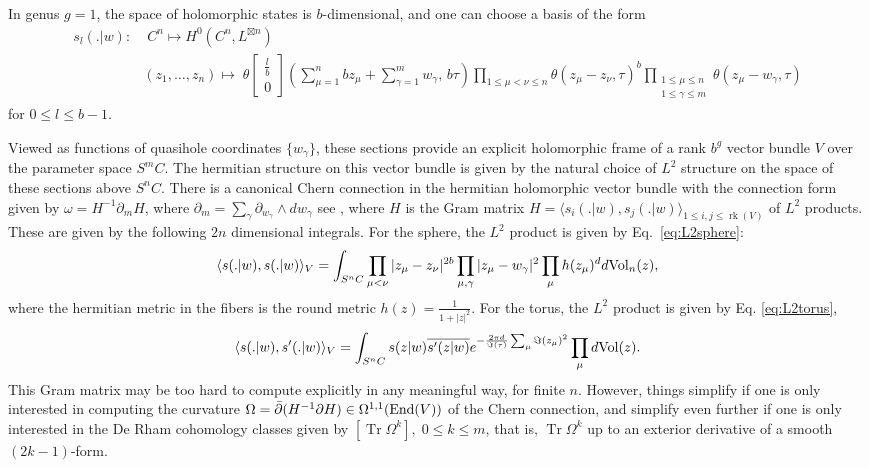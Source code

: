 \documentclass{article}
\theoremstyle{definition}
\DeclareMathOperator{\rk}{rk}
\DeclareMathOperator{\tr}{Tr}
\newcommand{\chara}[2]{\begin{bmatrix} #1 \\ #2 \end{bmatrix}}
\newcommand{\ov}[1]{\overline{#1}}
\renewcommand{\leq}{\leqslant}
\begin{document}
In genus \(g=1\), the space of holomorphic states is \(b\)-dimensional, and one can choose a basis of the form
\begin{align*}
s_l(.|w):&\; C^n\mapsto H^0(C^n, L^{\boxtimes n})\\ & (z_1,\dots,z_n) \mapsto \; \theta \chara{\frac{l}{b}}{0} \left(\sum_{\mu=1}^n b z_\mu + \sum_{\gamma=1}^m w_\gamma,\,b\tau\right)
\prod_{1\leqslant\mu<\nu\leqslant n} \theta(z_\mu - z_\nu,\tau)^b
\prod_{\substack{1\leqslant\mu\leqslant n\\1\leqslant\gamma\leqslant m}}\theta(z_\mu-w_\gamma,\tau)
\end{align*}
for $0 \leq l \leq b-1$.

Viewed as functions of quasihole coordinates $\{w_\gamma\}$, these sections provide an explicit holomorphic frame of a rank $b^g$ vector bundle $V$ over the parameter space $S^mC$. The hermitian structure on this vector bundle is given by the natural choice of $L^2$ structure on the space of these sections above $S^nC$. There is a canonical Chern connection in the hermitian holomorphic vector bundle with the connection form given by $\omega=H^{-1}\partial_m H$, where $\partial_m=\sum_\gamma\partial_{w_\gamma}\wedge dw_\gamma$ see \cite[Ch.1]{Kobayashi}, where $H$ is
the Gram matrix $H=\langle s_i(.|w) ,s_j(.|w)\rangle_{1\leq i , j \leq \rk(V)}$ of $L^2$ products. These are given by the following $2n$ dimensional integrals. For the sphere, the $L^2$ product is given by Eq.\ \eqref{eq:L2sphere}:
\begin{equation*}
\langle s(.|w),s(.|w) \rangle_V=\int_{S^n C}\prod_{\mu<\nu} |z_\mu - z_\nu |^{2b} \prod_{\mu,\gamma}  |z_\mu-w_\gamma|^2 \prod_\mu h(z_\mu)^d d{\rm Vol}_n(z),
\end{equation*}
where the hermitian metric in the fibers is the round metric $h(z)=\frac1{1+|z|^2}$. 
For the torus, the $L^2$ product is given by Eq. \eqref{eq:L2torus},
$$\langle s(.|w),s'(.|w) \rangle_V = \int_{S^n C} s(z|w) \ov{s'(z|w)} e^{-\frac{2\pi d}{\Im(\tau)}\sum_\mu \Im(z_\mu)^2} \prod_\mu d{\rm Vol}(z).$$
This Gram matrix may be too hard to compute explicitly in any meaningful way, for finite $n$. However, things simplify if one is only interested in computing the curvature $\Omega=\bar\partial( H^{-1}\partial H)\in \Omega^{1,1}({\rm End}(V))$ of the Chern connection, and simplify even further if one is only interested in the De Rham cohomology classes given by $[\tr \Omega^k],\;0\leqslant k\leqslant m$, that is, $\tr \Omega^k$ up to an exterior derivative of a smooth $(2k-1)$-form.
\end{document}
